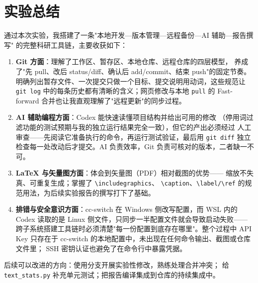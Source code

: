 \documentclass{SYSUReport}
\begin{document}
\section{实验总结}

通过本次实验，我搭建了一条"本地开发—版本管理—远程备份—AI 辅助—报告撰写"
的完整科研工具链，主要收获如下：

\begin{enumerate}
  \item \textbf{Git 方面}：理解了工作区、暂存区、本地仓库、远程仓库的四层模型，
  养成了"先 pull、改后 status/diff、确认后 add/commit、结束 push"的固定节奏。
  明确列出暂存文件、一次提交只做一个目标、提交说明用动词，这些规范让
  \texttt{git log} 中的每条历史都有清晰的含义；网页修改与本地 \texttt{pull}
  的 Fast-forward 合并也让我直观理解了"远程更新"的同步过程。
  \item \textbf{AI 辅助编程方面}：Codex 能快速读懂项目结构并给出可用的修改
  （停用词过滤功能的测试预期与我的独立运行结果完全一致），但它的产出必须经过
  人工审查——先阅读它准备执行的命令，再运行测试验证，最后用 \texttt{git diff}
  独立检查每一处改动后才提交。AI 负责效率，Git 负责可核对的版本，二者缺一不可。
  \item \textbf{LaTeX 与矢量图方面}：体会到矢量图（PDF）相对截图的优势——
  缩放不失真、可重复生成；掌握了 \texttt{\textbackslash includegraphics}、
  \texttt{\textbackslash caption}、\texttt{\textbackslash label/\textbackslash ref}
  的规范用法，为后续实验报告的撰写打下了基础。
  \item \textbf{排错与安全意识方面}：cc-switch 在 Windows 侧改写配置，而 WSL 内的
  Codex 读取的是 Linux 侧文件，只同步一半配置文件就会导致启动失败——
  跨子系统搭建工具链时必须清楚"每一份配置到底存在哪里"。整个过程中 API Key
  只存在于 cc-switch 的本地配置中，未出现在任何命令输出、截图或仓库文件里；
  SSH 密钥认证也避免了在命令行中暴露凭据。
\end{enumerate}

后续可以改进的方向：使用分支开展实验性修改，熟练处理合并冲突；
给 \texttt{text\_stats.py} 补充单元测试；把报告编译集成到仓库的持续集成中。

% 
\end{document}
